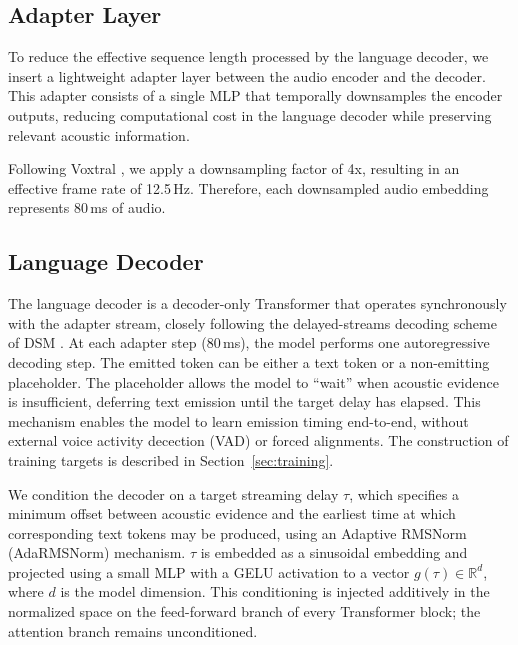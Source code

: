 \subsection{Adapter Layer}

To reduce the effective sequence length processed by the language decoder, we insert a lightweight adapter layer between the audio encoder and the decoder. This adapter consists of a single MLP that temporally downsamples the encoder outputs, reducing computational cost in the language decoder while preserving relevant acoustic information.

Following Voxtral \citep{liu2025voxtral}, we apply a downsampling factor of 4x, resulting in an effective frame rate of 12.5\,Hz. Therefore, each downsampled audio embedding represents 80\,ms of audio.

\subsection{Language Decoder} \label{sec:lang-dec}

The language decoder is a decoder-only Transformer that operates synchronously with the adapter stream, closely following the delayed-streams decoding scheme of DSM \citep{zeghidour2025streaming}. At each adapter step (80\,ms), the model performs one autoregressive decoding step. The emitted token can be either a text token or a non-emitting placeholder. The placeholder allows the model to ``wait'' when acoustic evidence is insufficient, deferring text emission until the target delay has elapsed. This mechanism enables the model to learn emission timing end-to-end, without external voice activity decection (VAD) or forced alignments. The construction of training targets is described in Section~\ref{sec:training}.

We condition the decoder on a target streaming delay $\tau$, which specifies a minimum offset between acoustic evidence and the earliest time at which corresponding text tokens may be produced, using an Adaptive RMSNorm (AdaRMSNorm) mechanism. $\tau$ is embedded as a sinusoidal embedding and projected using a small MLP with a GELU activation to a vector $g(\tau)\in\mathbb{R}^d$, where $d$ is the model dimension. This conditioning is injected additively in the normalized space on the feed-forward branch of every Transformer block; the attention branch remains unconditioned.

